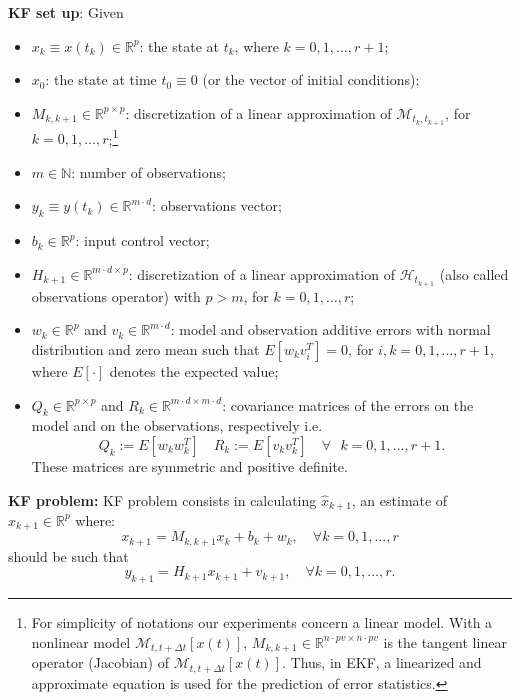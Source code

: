 \noindent \textbf{KF set up}: Given 
\begin{itemize}
\item $x_{k}\equiv x(t_{k})\in \mathbb{R}^{p}$: the state  at $t_{k}$, where $k=0,1,\ldots,r+1$; 
\item $ x_{0}$: the state at time $t_{0}\equiv 0$ (or the vector of initial conditions);
\item $M_{k,k+1}\in \mathbb{R}^{p\times p}$: discretization of a linear approximation of $\mathcal{M}_{t_{k},t_{k+1}}$, for $k=0,1,\ldots,r$;\footnote{
 For simplicity of notations our experiments concern  a linear model. With a nonlinear model $\mathcal{M}_{t,t+\Delta t}[ x(t)]$, $M_{k,k+1}\in \mathbb{R}^{n\cdot pv \times n\cdot pv}$ is 
the tangent linear operator (Jacobian) of $\mathcal{M}_{t,t+\Delta t}[ x(t)]$.
Thus, in  EKF, a linearized
and approximate equation is used for the prediction of
error statistics.}
\item $m\in \mathbb{N}$:  number of observations;
\item $y_{k}\equiv y(t_{k})\in \mathbb{R}^{m\cdot d}$:  observations vector;
\item $b_{k}\in \mathbb{R}^{ p}$: input control vector;
\item $H_{k+1}\in \mathbb{R}^{m\cdot d \times p}$: discretization of a linear approximation of $\mathcal{H}_{t_{k+1}}$ (also called observations operator)  with $p>m$, for $k=0,1,\ldots,r$;
\item $w_{k}\in \mathbb{R}^{p}$ and $v_{k}\in \mathbb{R}^{m\cdot d}$: model and observation additive errors with normal distribution and zero mean such that $E[w_{k}v_{i}^{T}]=0$, for $i,k=0,1,\ldots,r+1$, where $E[\cdot]$ denotes the expected value;
\item $Q_{k}\in \mathbb{R}^{p\times p}$ and $R_{k}\in \mathbb{R}^{m\cdot d \times m\cdot d}$: covariance matrices of the errors on the model and on the observations, respectively i.e.
\begin{equation}
Q_{k}:=E[w_{k}w_{k}^{T}] \quad R_{k}:=E[v_{k}v_{k}^{T}] \quad \textit{$\forall$ $k=0,1,\ldots,r+1$}.
\end{equation}
\noindent These matrices are symmetric and positive definite.
\end{itemize}

\noindent \textbf{KF problem:} KF problem  consists in calculating  $\widehat{x}_{k+1}$, an estimate  of  $x_{k+1}\in \mathbb{R}^{p}$ where:
\begin{equation}\label{sistema_kalmandiscreto}
x_{k+1}=M_{k,k+1}x_{k}+b_{k}+w_{k}, \quad \textit{$\forall k=0,1,\ldots,r$}
\end{equation}
should be such that 
\begin{equation}\label{problema1}
y_{k+1}=H_{k+1}{x}_{k+1}+v_{k+1},\quad \textit{$\forall k=0,1,\ldots,r$}.
\end{equation}



